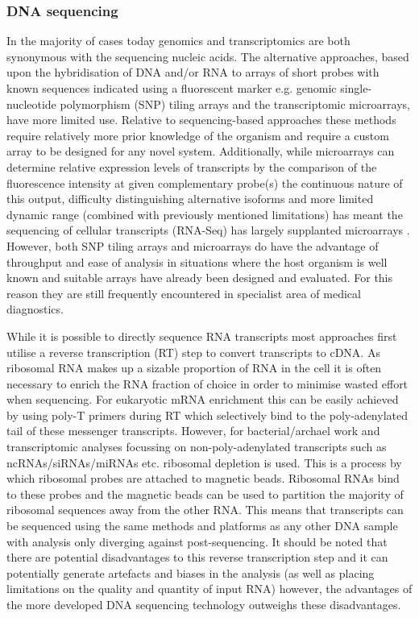 \subsubsection{DNA sequencing}

In the majority of cases today genomics and transcriptomics are both synonymous with
the sequencing nucleic acids.  The alternative approaches, based upon the
hybridisation of DNA and/or RNA to arrays of short probes with known sequences indicated
using a fluorescent marker e.g. genomic single-nucleotide polymorphism (SNP) tiling arrays 
and the transcriptomic microarrays, have more limited use.  
Relative to sequencing-based approaches these methods
require relatively more prior knowledge of the organism and require a custom array to be
designed for any novel system. Additionally, while microarrays can determine relative expression levels
of transcripts by the comparison of the fluorescence intensity at given complementary probe(s)
the continuous nature of this output, difficulty distinguishing alternative isoforms 
and more limited dynamic range (combined with previously mentioned limitations) 
has meant the sequencing of cellular transcripts (RNA-Seq) has largely supplanted microarrays \citep{Wang2009}.
However, both SNP tiling arrays and microarrays do have the advantage of throughput and ease of analysis
in situations where the host organism is well known and suitable arrays have already been designed
and evaluated.  For this reason they are still frequently encountered in specialist area of medical 
diagnostics.


While it is possible to directly sequence RNA transcripts \citep{Ozsolak2009} most approaches first utilise a reverse transcription (RT)
step to convert transcripts to cDNA. As ribosomal RNA makes up a sizable proportion of RNA in the cell
it is often necessary to enrich the RNA fraction of choice in order to minimise wasted effort when
sequencing.  For eukaryotic mRNA enrichment this can be easily achieved by
using poly-T primers during RT which selectively bind to the poly-adenylated tail of these messenger 
transcripts.  However, for bacterial/archael work and transcriptomic analyses focussing on non-poly-adenylated
transcripts such as ncRNAs/siRNAs/miRNAs etc. ribosomal depletion is used.  This is a process by which 
ribosomal probes are attached to magnetic beads. Ribosomal RNAs bind to these probes and the magnetic
beads can be used to partition the majority of ribosomal sequences away from the other RNA.
This means that transcripts can be sequenced using the same methods and platforms as any other DNA sample with analysis only diverging against post-sequencing.
It should be noted that there are potential disadvantages to this reverse transcription step and it
can potentially generate artefacts and biases in the analysis (as well as placing limitations on the quality
and quantity of input RNA) \citep{Ozsolak2011} however, the advantages of the more developed DNA sequencing technology outweighs these
disadvantages.


